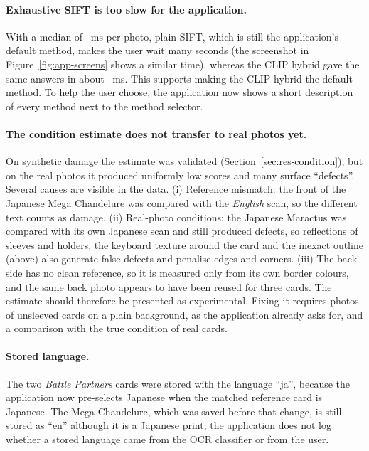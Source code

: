 \paragraph{Exhaustive SIFT is too slow for the application.} With a median of ~ms per photo, plain SIFT, which is still the application's default method, makes the user wait many seconds (the screenshot in Figure~\ref{fig:app-screens} shows a similar time), whereas the CLIP hybrid gave the same answers in about ~ms. This supports making the CLIP hybrid the default method. To help the user choose, the application now shows a short description of every method next to the method selector.

\paragraph{The condition estimate does not transfer to real photos yet.} On synthetic damage the estimate was validated (Section~\ref{sec:res-condition}), but on the real photos it produced uniformly low scores and many surface ``defects''. Several causes are visible in the data. (i) Reference mismatch: the front of the Japanese Mega Chandelure was compared with the \emph{English} scan, so the different text counts as damage. (ii) Real-photo conditions: the Japanese Maractus was compared with its own Japanese scan and still produced  defects, so reflections of sleeves and holders, the keyboard texture around the card and the inexact outline (above) also generate false defects and penalise edges and corners. (iii) The back side has no clean reference, so it is measured only from its own border colours, and the same back photo appears to have been reused for three cards. The estimate should therefore be presented as experimental. Fixing it requires photos of unsleeved cards on a plain background, as the application already asks for, and a comparison with the true condition of real cards.

\paragraph{Stored language.} The two \emph{Battle Partners} cards were stored with the language ``ja'', because the application now pre-selects Japanese when the matched reference card is Japanese. The Mega Chandelure, which was saved before that change, is still stored as ``en'' although it is a Japanese print; the application does not log whether a stored language came from the OCR classifier or from the user.

